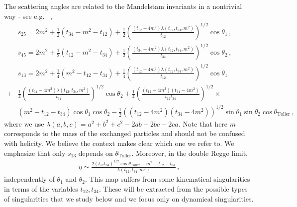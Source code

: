 The scattering angles are related to the Mandelstam invariants in a nontrivial way - see e.g. ~\cite{Weis:1972tbu,White:1973ola},
\begin{align}
  \label{eq:sijtoangles}
    & s_{25}= 2m^2+\frac{1}{2}\left(t_{34}-m^2-t_{12}\right)+\frac{1}{2}\left(\frac{(t_{12}-4m^2)\lambda(t_{12},t_{34},m^2)}{t_{12}}\right)^{1/2} \cos\theta_1\,,          \nonumber                  \\
    & s_{45}= 2m^2+\frac{1}{2}\left(t_{12}-m^2-t_{34}\right)+\frac{1}{2}\left(\frac{(t_{34}-4m^2)\lambda(t_{12},t_{34},m^2)}{t_{34}}\right)^{1/2} \cos\theta_2\,,           \nonumber                 \\
    & s_{13}=2m^2+\frac{1}{4}\left(m^2-t_{12}-t_{34}\right)+\frac{1}{4}\left(\frac{(t_{12}-4m^2)\lambda(t_{12},t_{34},m^2)}{t_{12}}\right)^{1/2} \cos\theta_1                                         \\
  + & \frac{1}{4}\left(\frac{(t_{34}-4m^2)\lambda(t_{12},t_{34},m^2)}{t_{34}}\right)^{1/2} \cos\theta_2+\frac{1}{4}\left(\frac{(t_{12}-4m^2)(t_{34}-4m^2)}{t_{12} t_{34}}\right)^{1/2}\times\nonumber \\
    & \left(m^2-t_{12}-t_{34}\right)\cos \theta_1 \cos \theta_2-\frac{1}{2}\left((t_{12}-4m^2)(t_{34}-4m^2)\right)^{1/2}\sin \theta_1\sin \theta_2 \cos\theta_{\text{Toller}}\,,\nonumber
\end{align}
where we use $\lambda(a,b,c)=a^2+b^2+c^2-2ab-2bc-2ca$. Note that here $m$ corresponds to the mass of the exchanged particles and should not be confused with helicity. We believe the context makes clear which one we refer to.
We emphasize that only $s_{13}$ depends on $\theta_{\text{Toller}}$.
Moreover, in the double Regge limit,
\begin{align}
  \label{eq:etaandToller}
  \eta\sim \frac{2(t_{12} t_{34})^{1/2}\cos \theta_{\text{Toller}}+m^2-t_{12}-t_{34}}{\lambda(t_{12},t_{34},m^2)}\,,
\end{align}
independently of $\theta_1$ and $\theta_2$.
This map suffers from some kinematical singularities in terms of the variables $t_{12}, t_{34}$.
These will be extracted from the possible types of singularities that we study below and we focus only on dynamical singularities.

